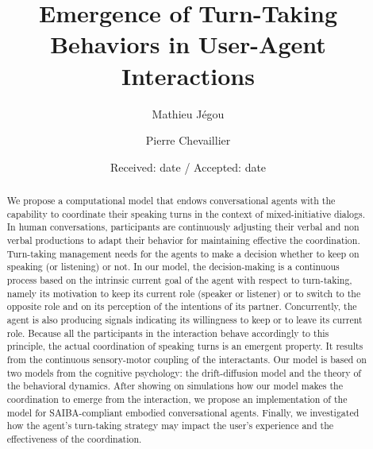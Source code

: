 \documentclass[twocolumn]{svjour3}
\begin{document}
\title{Emergence of Turn-Taking Behaviors in User-Agent Interactions}

\author{Mathieu J\'egou  \and
        Pierre Chevaillier
}


\date{Received: date / Accepted: date}

\maketitle 

\begin{abstract}
We propose a computational model that endows conversational agents with the capability to coordinate their speaking turns in the context of mixed-initiative dialogs.
In human conversations, participants are continuously adjusting their verbal and non verbal productions to adapt their behavior for maintaining effective the coordination. Turn-taking management needs for the agents to make a decision whether to keep on speaking (or listening) or not. In our model, the decision-making is a continuous process based on the intrinsic current goal of the agent with respect to turn-taking, namely its motivation to keep its current role (speaker or listener) or to switch to the opposite role and on its perception of the intentions of its partner. Concurrently, the agent is also producing signals indicating its willingness to keep or to leave its current role. Because all the participants in the interaction behave accordingly to this principle, the actual coordination of speaking turns is an emergent property. It results from the continuous sensory-motor coupling of the interactants. Our model is based on two models from the cognitive psychology: the drift-diffusion model and the theory of the behavioral dynamics. After showing on simulations how our model makes the coordination to emerge from the interaction, we propose an implementation of the model for SAIBA-compliant embodied conversational agents. Finally, we investigated how the agent's turn-taking strategy may impact the user's experience and the effectiveness of the coordination.
 
\end{abstract}


















\end{document}
